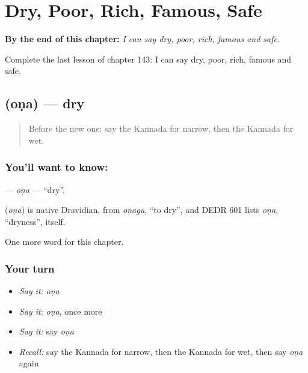 
\chapter{Dry, Poor, Rich, Famous, Safe}
\label{ch:ka-dry-poor-rich-famous-safe}

\begin{chapteropening}
\textbf{By the end of this chapter:} \emph{I can say dry, poor, rich, famous and safe.}

Complete the last lesson of chapter 143: I can say dry, poor, rich, famous and safe.
\end{chapteropening}

\section[\texorpdfstring{\kn{ಒಣ} (oṇa)}{ಒಣ (oṇa)}]{ (oṇa) — dry}

\label{lesson:KA-C143-ona}



\begin{quote}
Before the new one: say the Kannada for narrow, then the Kannada for wet.
\end{quote}

\subsection*{You'll want to know: }
\textbf{} — \emph{oṇa} — \textquotedblleft{}dry\textquotedblright{}.

\begin{cousinweb}
\textbf{} (\emph{oṇa}) is native Dravidian, from \emph{oṇagu}, \textquotedblleft{}to dry\textquotedblright{}, and DEDR 601 lists \emph{oṇa}, \textquotedblleft{}dryness\textquotedblright{}, itself.
\end{cousinweb}

\begin{grammarlens}[title={What you've built}]
One more word for this chapter.
\end{grammarlens}

\subsection*{Your turn}
\begin{itemize}
\raggedright
  \item \emph{Say it:} \emph{oṇa}
  \item \emph{Say it:} \emph{oṇa}, once more
  \item \emph{Say it:} say \emph{oṇa}
  \item \emph{Recall:} say the Kannada for narrow, then the Kannada for wet, then say \emph{oṇa} again
\end{itemize}

